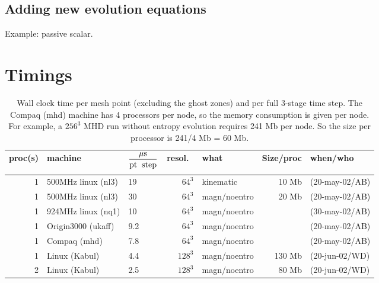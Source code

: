 \documentclass[12pt,twoside,notitlepage,a4paper]{article}
\begin{document}

\subsection{Adding new evolution equations}

Example: passive scalar.


\section{Timings}

\begin{table}[htb]
  \begin{center}
    \caption{
      Wall clock time per mesh point (excluding the ghost zones)
      and per full 3-stage time step.
      The Compaq (mhd) machine has 4 processors per node, so the memory
      consumption is given per node.
      For example, a $256^3$ MHD run without entropy evolution requires 241 Mb
      per node. So the size per processor is 241/4 Mb = 60 Mb.
      }
    \label{Ttimescale}
    \begin{small}
      \begin{tabular}{rllrlrl}
proc(s)& machine          &  $\displaystyle\frac{{\mu\rm s}}{\rm pt\;\;step}
                             \rule[-2.8ex]{0pt}{5pt}$
                                 & resol.\ & what         & Size/proc
                                                                   & when/who \\
\hline
 1    & 500MHz linux (nl3)&  19  &  $64^3$ & kinematic    &  10 Mb & (20-may-02/AB)\\
 1    & 500MHz linux (nl3)&  30  &  $64^3$ & magn/noentro &  20 Mb & (20-may-02/AB)\\
 1    & 924MHz linux (nq1)&  10  &  $64^3$ & magn/noentro &        & (30-may-02/AB)\\
 1    & Origin3000 (ukaff)& 9.2  &  $64^3$ & magn/noentro &        & (20-may-02/AB)\\
 1    & Compaq (mhd)      & 7.8  &  $64^3$ & magn/noentro &        & (20-may-02/AB)\\
 1    & Linux (Kabul)     & 4.4  & $128^3$ & magn/noentro & 130 Mb & (20-jun-02/WD)\\
 2    & Linux (Kabul)     & 2.5  & $128^3$ & magn/noentro &  80 Mb & (20-jun-02/WD)\\

\end{tabular}
\end{small}
\end{center}
\end{table}
\end{document}
